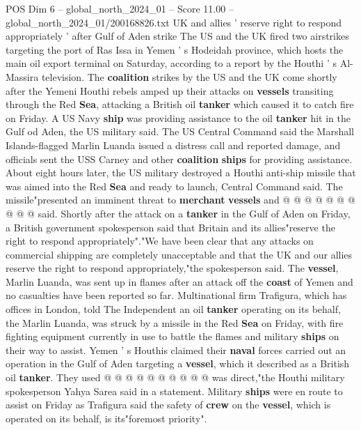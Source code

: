 \begin{textsample}{POS Dim 6 – global\_north\_2024\_01 – Score 11.00 – global\_north\_2024\_01/200168826.txt}  \label{ex:f6_pos_091}
UK and allies ' reserve right to respond appropriately ' after Gulf of Aden strike The US and the UK fired two airstrikes targeting the port of Ras Issa in Yemen ' s Hodeidah province, which hosts the main oil export terminal on Saturday, according to a report by the Houthi ' s Al-Massira television.
The \textbf{coalition} strikes by the US and the UK come shortly after the Yemeni Houthi rebels amped up their attacks on \textbf{vessels} transiting through the Red \textbf{Sea}, attacking a British oil \textbf{tanker} which caused it to catch fire on Friday.
A US Navy \textbf{ship} was providing assistance to the oil \textbf{tanker} hit in the Gulf od Aden, the US military said.
The US Central Command said the Marshall Islands-flagged Marlin Luanda issued a distress call and reported damage, and officials sent the USS Carney and other \textbf{coalition} \textbf{ships} for providing assistance.
About eight hours later, the US military destroyed a Houthi anti-ship missile that was aimed into the Red \textbf{Sea} and ready to launch, Central Command said.
The missile"presented an imminent threat to \textbf{merchant} \textbf{vessels} and @ @ @ @ @ @ @ @ @ @ said.
Shortly after the attack on a \textbf{tanker} in the Gulf of Aden on Friday, a British government spokesperson said that Britain and its allies"reserve the right to respond appropriately"."We have been clear that any attacks on commercial shipping are completely unacceptable and that the UK and our allies reserve the right to respond appropriately,"the spokesperson said.
The \textbf{vessel}, Marlin Luanda, was sent up in flames after an attack off the \textbf{coast} of Yemen and no casualties have been reported so far.
Multinational firm Trafigura, which has offices in London, told The Independent an oil \textbf{tanker} operating on its behalf, the Marlin Luanda, was struck by a missile in the Red \textbf{Sea} on Friday, with fire fighting equipment currently in use to battle the flames and military \textbf{ships} on their way to assist.
Yemen ' s Houthis claimed their \textbf{naval} forces carried out an operation in the Gulf of Aden targeting a \textbf{vessel}, which it described as a British oil \textbf{tanker}.
They used @ @ @ @ @ @ @ @ @ @ was direct,"the Houthi military spokesperson Yahya Sarea said in a statement.
Military \textbf{ships} were en route to assist on Friday as Trafigura said the safety of \textbf{crew} on the \textbf{vessel}, which is operated on its behalf, is its"foremost priority".

\end{textsample}
